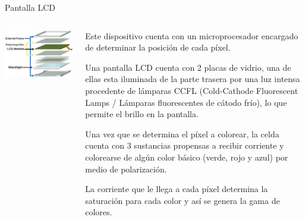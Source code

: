 \begin{frame}

  \begin{block}{Pantalla \ac{LCD}}
    \begin{columns}[T]

      \begin{column}[T]{0.5\textwidth}
        \includegraphics[width=\linewidth]{imagenes/1.4.pantalla.electronica/lcd_partes.jpg}
      \end{column}

      \begin{column}[T]{0.5\textwidth}
	
        \begin{itemize}
{\footnotesize
        \item Este dispositivo cuenta con un microprocesador encargado de determinar la posici\'on de cada píxel.

        \item Una pantalla LCD cuenta con 2 placas de vidrio, una de ellas esta iluminada de la parte trasera por una luz intensa procedente de l\'amparas CCFL (Cold-Cathode Fluorescent Lamps / L\'amparas fluorescentes de c\'atodo fr\'io), lo que permite el brillo en la pantalla.

        \item Una vez que se determina el p\'ixel a colorear, la celda cuenta con 3 sustancias propensas a recibir corriente y colorearse de alg\'un color básico (verde, rojo y azul) por medio de polarizaci\'on.

        \item La corriente que le llega a cada p\'ixel determina la saturaci\'on para cada color y as\'i se genera la gama de colores.

}
\end{itemize}
\end{column}
\end{columns}
\end{block}
\end{frame}
